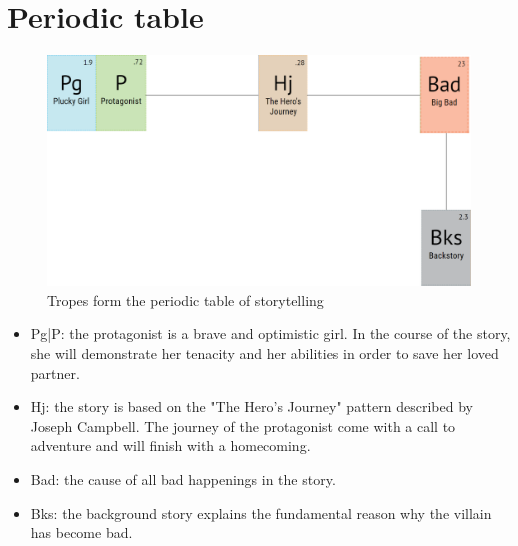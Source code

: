 \section{Periodic table}

\begin{figure}[H]
  \centering
  \includegraphics[width=14cm]{Images/Diagrams/periodicTable}
  \caption{Tropes form the periodic table of storytelling}
\end{figure}

\begin{itemize}
\item Pg|P: the protagonist is a brave and optimistic girl. In the course of the story, she will demonstrate her tenacity and her abilities in order to save her loved partner.
\item Hj: the story is based on the "The Hero's Journey" pattern described by Joseph Campbell. The journey of the protagonist come with a call to adventure and will finish with a homecoming.
\item Bad: the cause of all bad happenings in the story.
\item Bks: the background story explains the fundamental reason why the villain has become bad.
\end{itemize}
